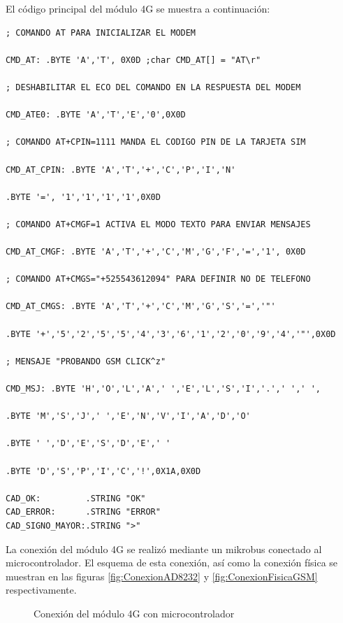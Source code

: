 El código principal del módulo 4G se muestra a continuación:
{\small 
\begin{lstlisting}[frame=single]
; COMANDO AT PARA INICIALIZAR EL MODEM

CMD_AT: .BYTE 'A','T', 0X0D	;char CMD_AT[] = "AT\r"

; DESHABILITAR EL ECO DEL COMANDO EN LA RESPUESTA DEL MODEM

CMD_ATE0: .BYTE 'A','T','E','0',0X0D

; COMANDO AT+CPIN=1111 MANDA EL CODIGO PIN DE LA TARJETA SIM

CMD_AT_CPIN: .BYTE 'A','T','+','C','P','I','N'

.BYTE '=', '1','1','1','1',0X0D

; COMANDO AT+CMGF=1 ACTIVA EL MODO TEXTO PARA ENVIAR MENSAJES

CMD_AT_CMGF: .BYTE 'A','T','+','C','M','G','F','=','1', 0X0D

; COMANDO AT+CMGS="+525543612094" PARA DEFINIR NO DE TELEFONO

CMD_AT_CMGS: .BYTE 'A','T','+','C','M','G','S','=','"'

.BYTE '+','5','2','5','5','4','3','6','1','2','0','9','4','"',0X0D

; MENSAJE "PROBANDO GSM CLICK^z"

CMD_MSJ: .BYTE 'H','O','L','A',' ','E','L','S','I','.',' ',' ',

.BYTE 'M','S','J',' ','E','N','V','I','A','D','O'

.BYTE ' ','D','E','S','D','E',' '

.BYTE 'D','S','P','I','C','!',0X1A,0X0D

CAD_OK:         .STRING "OK"
CAD_ERROR:      .STRING "ERROR"
CAD_SIGNO_MAYOR:.STRING ">"
\end{lstlisting}
}
La conexión del módulo 4G se realizó mediante un mikrobus conectado al microcontrolador. El esquema de esta conexión, así como la conexión física se muestran en las figuras \ref{fig:ConexionAD8232} y \ref{fig:ConexionFisicaGSM} respectivamente.

	\begin{figure}[htbp!]
		\centering
		\caption{Conexión del módulo 4G con microcontrolador}
		\label{fig:ConexionGSM}
	\end{figure}
	
